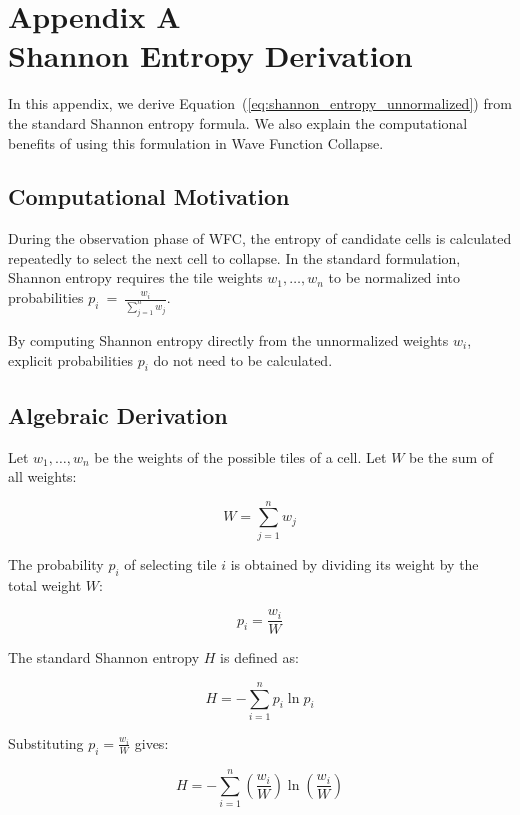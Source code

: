 \documentclass[main.tex]{subfiles}
\begin{document}
\chapter*{\Large Appendix A\\[0.6em]\Huge Shannon Entropy Derivation}
\label{cha:appendix_entropy}

In this appendix, we derive Equation~(\ref{eq:shannon_entropy_unnormalized}) from the standard Shannon entropy formula. We also explain the computational benefits of using this formulation in Wave Function Collapse.

\section*{Computational Motivation}

During the observation phase of WFC, the entropy of candidate cells is calculated repeatedly to select the next cell to collapse. In the standard formulation, Shannon entropy requires the tile weights $w_1, \ldots, w_n$ to be normalized into probabilities $p_i~=~\frac{w_i}{\sum_{j=1}^{n} w_j}$. 

By computing Shannon entropy directly from the unnormalized weights $w_i$, explicit probabilities $p_i$ do not need to be calculated.

\section*{Algebraic Derivation}

Let $w_1, \ldots, w_n$ be the weights of the possible tiles of a cell. Let $W$ be the sum of all weights:

\begin{equation}
    W = \sum_{j=1}^{n} w_j
\end{equation}

The probability $p_i$ of selecting tile $i$ is obtained by dividing its weight by the total weight $W$:

\begin{equation}
    p_i = \frac{w_i}{W}
\end{equation}

The standard Shannon entropy $H$ is defined as:

\begin{equation}
    H = - \sum_{i=1}^{n} p_i \ln p_i
\end{equation}

Substituting $p_i = \frac{w_i}{W}$ gives:

\begin{equation}
    H = - \sum_{i=1}^{n} \left( \frac{w_i}{W} \right) \ln \left( \frac{w_i}{W} \right)
\end{equation}
\end{document}
